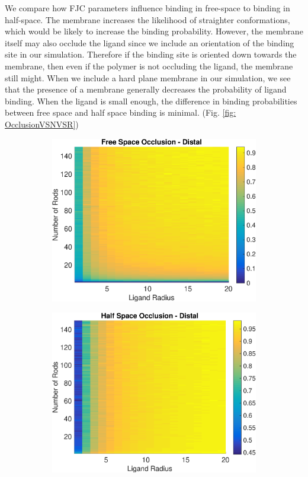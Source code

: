 \documentclass[../../AdvancementSummary.tex]{subfiles}
\begin{document}
We compare how FJC parameters influence binding in free-space to binding in half-space. The membrane increases the likelihood of straighter conformations, which would be likely to increase the binding probability. However, the membrane itself may also occlude the ligand since we include an orientation of the binding site in our simulation. Therefore if the binding site is oriented down towards the membrane, then even if the polymer is not occluding the ligand, the membrane still might. When we include a hard plane membrane in our simulation, we see that the presence of a membrane generally decreases the probability of ligand binding.  When the ligand is small enough, the difference in binding probabilities between free space and half space binding is minimal. (Fig. \ref{fig: OcclusionVSNVSR})

\begin{figure}[H]
\begin{center}
\begin{subfigure}{0.4\linewidth}
\includegraphics[width=\linewidth]{ResultsFigures/General/OcclusionVSNVSRFree.eps}
\caption{}
\end{subfigure}
\begin{subfigure}{0.4\linewidth}
\includegraphics[width=\linewidth]{ResultsFigures/General/OcclusionVSNVSRHalf.eps}

\end{subfigure}
\end{center}
\end{figure}
\end{document}
